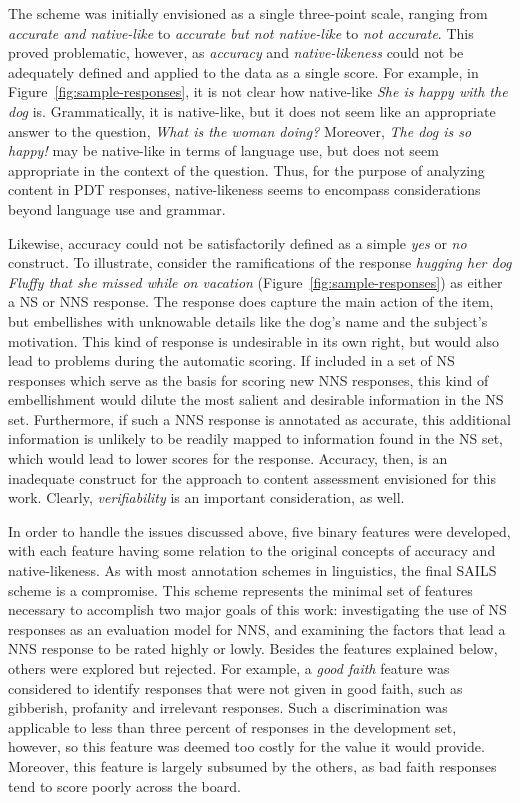 The scheme was initially envisioned as a single three-point scale, ranging from \textit{accurate and native-like} to \textit{accurate but not native-like} to \textit{not accurate}. This proved problematic, however, as \textit{accuracy} and \textit{native-likeness} could not be adequately defined and applied to the data as a single score.
For example, in Figure~\ref{fig:sample-responses}, it is not clear how native-like \textit{She is happy with the dog} is.  Grammatically, it is native-like, but it does not seem like an appropriate answer to the question, \textit{What is the woman doing?} Moreover, \textit{The dog is so happy!} may be native-like in terms of language use, but does not seem appropriate in the context of the question. Thus, for the purpose of analyzing content in PDT responses, native-likeness seems to encompass considerations beyond language use and grammar. 

Likewise, accuracy could not be satisfactorily defined as a simple \textit{yes} or \textit{no} construct. To illustrate, consider the ramifications of the response \textit{hugging her dog Fluffy that she missed while on vacation} (Figure~\ref{fig:sample-responses}) as either a NS or NNS response. The response does capture the main action of the item, but embellishes with unknowable details like the dog's name and the subject's motivation. This kind of response is undesirable in its own right, but would also lead to problems during the automatic scoring. If included in a set of NS responses which serve as the basis for scoring new NNS responses, this kind of embellishment would dilute the most salient and desirable information in the NS set. Furthermore, if such a NNS response is annotated as accurate, this additional information is unlikely to be readily mapped to information found in the NS set, which would lead to lower scores for the response. Accuracy, then, is an inadequate construct for the approach to content assessment envisioned for this work. Clearly, \textit{verifiability} is an important consideration, as well.


In order to handle the issues discussed above, five binary features were developed, with each feature having some relation to the original concepts of accuracy and native-likeness. As with most annotation schemes in linguistics, the final SAILS scheme is a compromise. This scheme represents the minimal set of features necessary to accomplish two major goals of this work: investigating the use of NS responses as an evaluation model for NNS, and examining the factors that lead a NNS response to be rated highly or lowly. Besides the features explained below, others were explored but rejected. For example, a \textit{good faith} feature was considered to identify responses that were not given in good faith, such as gibberish, profanity and irrelevant responses. Such a discrimination was applicable to less than three percent of responses in the development set, however, so this feature was deemed too costly for the value it would provide. Moreover, this feature is largely subsumed by the others, as bad faith responses tend to score poorly across the board.


